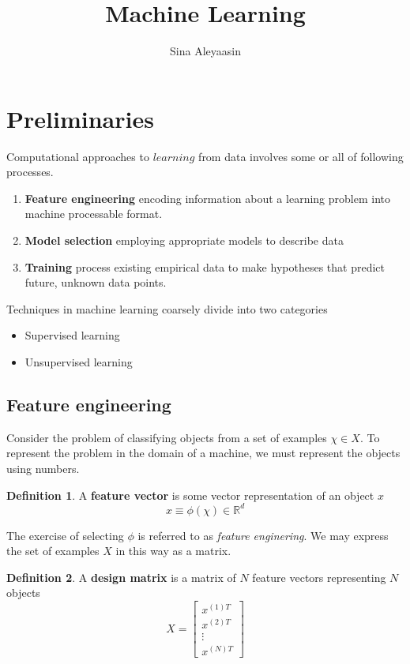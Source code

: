 \documentclass{article}
\title{Machine Learning}
\author{Sina Aleyaasin}
\theoremstyle{definition}
\newtheorem{definition}{Definition}[section]
\theoremstyle{remark}
\begin{document}
\maketitle

\section{Preliminaries}
Computational approaches to $learning$ from data involves some or all of following processes.
\begin{enumerate}
  \item \textbf{Feature engineering} encoding information about a learning problem into machine processable format.
  \item \textbf{Model selection} employing appropriate models to describe data
  \item \textbf{Training} process existing empirical data to make hypotheses that predict future, unknown data points.
\end{enumerate}
Techniques in machine learning coarsely divide into two categories
\begin{itemize}
  \item Supervised learning
  \item Unsupervised learning
\end{itemize}

\subsection{Feature engineering}
Consider the problem of classifying objects from a set of examples $\chi \in X$. 
To represent the problem in the domain of a machine, we must represent the objects using numbers.
\begin{definition}
A \textbf{feature vector} is some vector representation of an object $x$
  \begin{equation}
    x \equiv \phi(\chi) \in \mathbb{R}^{d}
    \label{eqn:featureengineering}
  \end{equation}
\end{definition}
The exercise of selecting $\phi$ is referred to as \textit{feature enginering}.
We may express the set of examples $X$ in this way as a matrix.
\begin{definition}
A \textbf{design matrix} is a matrix of $N$ feature vectors representing $N$ objects 
    \begin{equation}
    X = \begin{bmatrix}
        x^{(1)T} \\
        x^{(2)T} \\
        \vdots \\
        x^{(N)T}
    \end{bmatrix}
    \end{equation}
\end{definition} 
\end{document}
